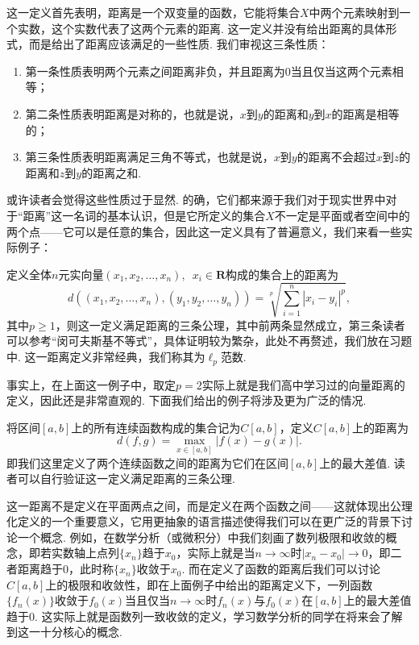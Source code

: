 这一定义首先表明，距离是一个双变量的函数，它能将集合$X$中两个元素映射到一个实数，这个实数代表了这两个元素的距离. 这一定义并没有给出距离的具体形式，而是给出了距离应该满足的一些性质. 我们审视这三条性质：
\begin{enumerate}
    \item 第一条性质表明两个元素之间距离非负，并且距离为0当且仅当这两个元素相等；

    \item 第二条性质表明距离是对称的，也就是说，$x$到$y$的距离和$y$到$x$的距离是相等的；

    \item 第三条性质表明距离满足三角不等式，也就是说，$x$到$y$的距离不会超过$x$到$z$的距离和$z$到$y$的距离之和.
\end{enumerate}

或许读者会觉得这些性质过于显然. 的确，它们都来源于我们对于现实世界中对于``距离''这一名词的基本认识，但是它所定义的集合$X$不一定是平面或者空间中的两个点——它可以是任意的集合，因此这一定义具有了普遍意义，我们来看一些实际例子：

\begin{example}
    定义全体$n$元实向量$(x_1,x_2,\ldots,x_n),\enspace x_i\in \mathbf{R}$构成的集合上的距离为
    \[d((x_1,x_2,\ldots,x_n),(y_1,y_2,\ldots,y_n))=\sqrt[p]{\sum_{i=1}^n|x_i-y_i|^p},\]
    其中$p \geqslant 1$，则这一定义满足距离的三条公理，其中前两条显然成立，第三条读者可以参考``闵可夫斯基不等式''，具体证明较为繁杂，此处不再赘述，我们放在习题中. 这一距离定义非常经典，我们称其为$\ell_p$范数.
\end{example}

事实上，在上面这一例子中，取定$p=2$实际上就是我们高中学习过的向量距离的定义，因此还是非常直观的. 下面我们给出的例子将涉及更为广泛的情况.

\begin{example}
    将区间$[a,b]$上的所有连续函数构成的集合记为$C[a,b]$，定义$C[a,b]$上的距离为
    \[d(f,g)=\max_{x\in [a,b]}|f(x)-g(x)|.\]
    即我们这里定义了两个连续函数之间的距离为它们在区间$[a,b]$上的最大差值. 读者可以自行验证这一定义满足距离的三条公理.
\end{example}

这一距离不是定义在平面两点之间，而是定义在两个函数之间——这就体现出公理化定义的一个重要意义，它用更抽象的语言描述使得我们可以在更广泛的背景下讨论一个概念. 例如，在数学分析（或微积分）中我们刻画了数列极限和收敛的概念，即若实数轴上点列$\{x_n\}$趋于$x_0$，实际上就是当$n\to\infty$时$|x_n-x_0|\to 0$，即二者距离趋于0，此时称$\{x_n\}$收敛于$x_0$. 而在定义了函数的距离后我们可以讨论$C[a,b]$上的极限和收敛性，即在上面例子中给出的距离定义下，一列函数$\{f_n(x)\}$收敛于$f_0(x)$当且仅当$n\to\infty$时$f_n(x)$与$f_0(x)$在$[a,b]$上的最大差值趋于0. 这实际上就是函数列一致收敛的定义，学习数学分析的同学在将来会了解到这一十分核心的概念.

